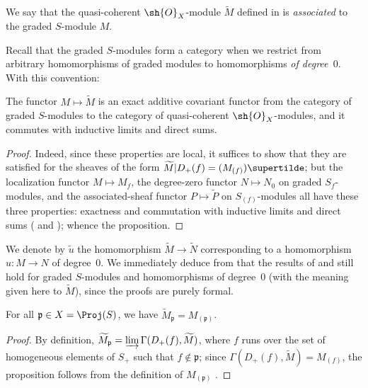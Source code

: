 \begin{definition}[2.5.3]
\label{II.2.5.3}
We say that the quasi-coherent $\sh{O}_X$-module $\widetilde{M}$ defined in  is \emph{associated} to the graded $S$-module $M$.
\end{definition}

Recall that the graded $S$-modules form a category when we restrict from arbitrary homomorphisms of graded modules to homomorphisms \emph{of degree~$0$}.
With this convention:

\begin{proposition}[2.5.4]
\label{II.2.5.4}
The functor $M\mapsto\widetilde{M}$ is an exact additive covariant functor from the category of graded $S$-modules to the category of quasi-coherent $\sh{O}_X$-modules, and it commutes with inductive limits and direct sums.
\end{proposition}

\begin{proof}
Indeed, since these properties are local, it suffices to show that they are satisfied for the sheaves of the form $\widetilde{M}|D_+(f)=(M_{(f)})\supertilde$;
  but the localization functor $M\mapsto M_f$, the degree-zero functor $N\mapsto N_0$ on graded $S_f$-modules, and the associated-sheaf functor $P\mapsto\widetilde{P}$ on $S_{(f)}$-modules all have these three properties: exactness and commutation with inductive limits and direct sums ( and );
whence the proposition.
\end{proof}

We denote by $\widetilde{u}$ the homomorphism $\widetilde{M}\to\widetilde{N}$ corresponding to a homomorphism $u: M\to N$ of degree~$0$.
We immediately deduce from  that the results of  and  still hold for graded $S$-modules and homomorphisms of degree~$0$ (with the meaning given here to $\widetilde{M}$), since the proofs are purely formal.

\begin{proposition}[2.5.5]
\label{II.2.5.5}
For all $\mathfrak{p}\in X=\Proj(S)$, we have $\widetilde{M}_\mathfrak{p}=M_{(\mathfrak{p})}$.
\end{proposition}

\begin{proof}
By definition, $\widetilde{M}_\mathfrak{p}=\varinjlim\Gamma(D_+(f),\widetilde{M})$, where $f$ runs over the set of homogeneous elements of $S_+$ such that $f\not\in\mathfrak{p}$;
  since $\Gamma(D_+(f),\widetilde{M})=M_{(f)}$, the proposition follows from the definition of $M_{(\mathfrak{p})}$ .
\end{proof}

